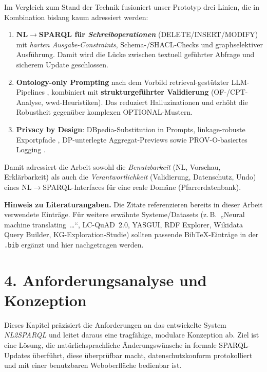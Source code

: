 Im Vergleich zum Stand der Technik fusioniert unser Prototyp drei Linien, die in Kombination bislang kaum adressiert werden:
\begin{enumerate}
  \item \textbf{NL$\rightarrow$SPARQL für \emph{Schreiboperationen}} (DELETE/INSERT/MODIFY) mit \emph{harten Ausgabe-Constraints}, Schema-/SHACL-Checks und graphselektiver Ausführung. Damit wird die Lücke zwischen textuell geführter Abfrage und sicherem Update geschlossen.
  \item \textbf{Ontology-only Prompting} nach dem Vorbild retrieval-gestützter LLM-Pipelines \cite{avila2024text2sparql}, kombiniert mit \textbf{strukturgeführter Validierung} (OF-/CPT-Analyse, wwd-Heuristiken). Das reduziert Halluzinationen und erhöht die Robustheit gegenüber komplexen OPTIONAL-Mustern.
  \item \textbf{Privacy by Design}: DBpedia-Substitution in Prompts, linkage-robuste Exportpfade \cite{delanaux_rdf_graph_anonymization_linkage,cuenca_kostylev_logical_foundations_ppdp_ld}, DP-unterlegte Aggregat-Previews \cite{buil_aranda_dp_sparql} sowie PROV-O-basiertes Logging \cite{kirrane2018access_control_rdf_survey}.
\end{enumerate}
Damit adressiert die Arbeit sowohl die \emph{Benutzbarkeit} (NL, Vorschau, Erklärbarkeit) als auch die \emph{Verantwortlichkeit} (Validierung, Datenschutz, Undo) eines NL$\rightarrow$SPARQL-Interfaces für eine reale Domäne (Pfarrerdatenbank).

\medskip
\noindent\textbf{Hinweis zu Literaturangaben.} Die Zitate \cite{avila2024text2sparql,delanaux_rdf_graph_anonymization_linkage,buil_aranda_dp_sparql,cuenca_kostylev_logical_foundations_ppdp_ld,kirrane2018access_control_rdf_survey} referenzieren bereits in dieser Arbeit verwendete Einträge. Für weitere erwähnte Systeme/Datasets (z.\,B.\ „Neural machine translating~…“, LC-QuAD~2.0, YASGUI, RDF Explorer, Wikidata Query Builder, KG-Exploration-Studie) sollten passende BibTeX-Einträge in der \texttt{.bib} ergänzt und hier nachgetragen werden.



\chapter{4. Anforderungsanalyse und Konzeption}
\label{sec:anforderungsanalyse-konzeption}

Dieses Kapitel präzisiert die Anforderungen an das entwickelte System \emph{NL2SPARQL} und leitet daraus eine tragfähige, modulare Konzeption ab. Ziel ist eine Lösung, die natürlichsprachliche Änderungswünsche in formale SPARQL-Updates überführt, diese überprüfbar macht, datenschutzkonform protokolliert und mit einer benutzbaren Weboberfläche bedienbar ist.

